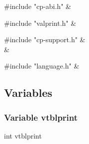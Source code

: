 \medskip
\begin{cxreftabi}
{\stt \#include "cp-abi.h"} &\\
\end{cxreftabi}

\medskip
\begin{cxreftabi}
{\stt \#include "valprint.h"} &\\
\end{cxreftabi}

\medskip
\begin{cxreftabi}
{\stt \#include "cp-support.h"} &\\
\hspace*{0.2in}{\stt \#include "symtab.h"} &\\
\end{cxreftabi}

\medskip
\begin{cxreftabi}
{\stt \#include "language.h"} &\\
\end{cxreftabi}


\subsection{Variables}


\subsubsection{Variable vtblprint}
\label{var_vtblprint_cp-valprint.c}

{\stt int vtblprint}

